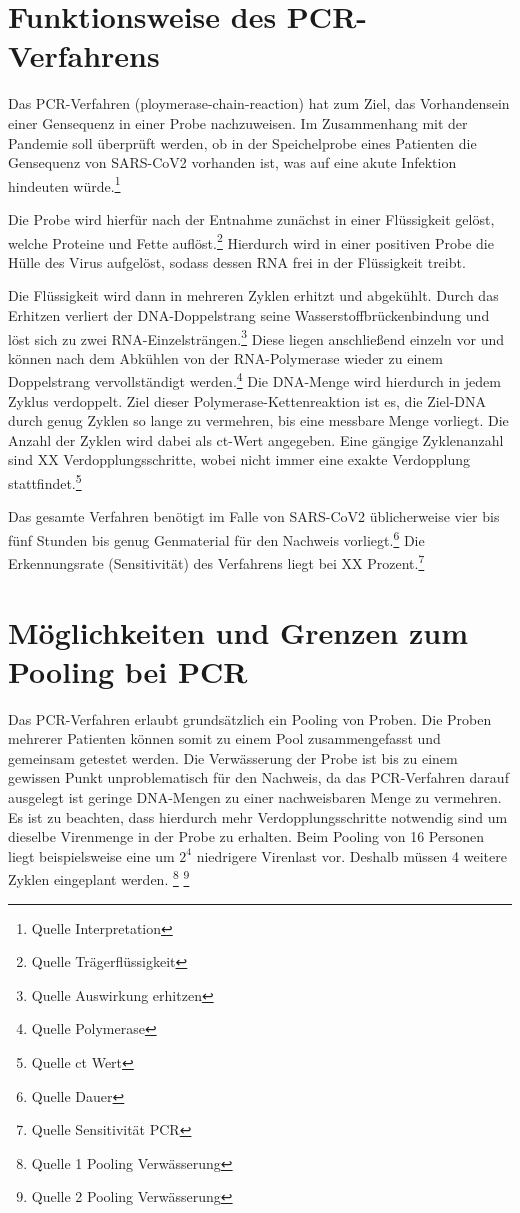 \cleardoublepage

\section{Funktionsweise des PCR-Verfahrens}
Das PCR-Verfahren (ploymerase-chain-reaction) hat zum Ziel, das Vorhandensein einer Gensequenz in einer Probe nachzuweisen.
Im Zusammenhang mit der Pandemie soll überprüft werden, ob in der Speichelprobe eines Patienten die Gensequenz von SARS-CoV2 vorhanden ist, was auf eine akute Infektion hindeuten würde.\footnote{Quelle Interpretation}

Die Probe wird hierfür nach der Entnahme zunächst in einer Flüssigkeit gelöst, welche Proteine und Fette auflöst.\footnote{Quelle Trägerflüssigkeit}
Hierdurch wird in einer positiven Probe die Hülle des Virus aufgelöst, sodass dessen RNA frei in der Flüssigkeit treibt.

Die Flüssigkeit wird dann in mehreren Zyklen erhitzt und abgekühlt.
Durch das Erhitzen verliert der DNA-Doppelstrang seine Wasserstoffbrückenbindung und löst sich zu zwei RNA-Einzelsträngen.\footnote{Quelle Auswirkung erhitzen}
Diese liegen anschließend einzeln vor und können nach dem Abkühlen von der RNA-Polymerase wieder zu einem Doppelstrang vervollständigt werden.\footnote{Quelle Polymerase}
Die DNA-Menge wird hierdurch in jedem Zyklus verdoppelt.
Ziel dieser Polymerase-Kettenreaktion ist es, die Ziel-DNA durch genug Zyklen so lange zu vermehren, bis eine messbare Menge vorliegt.
Die Anzahl der Zyklen wird dabei als ct-Wert angegeben.
Eine gängige Zyklenanzahl sind XX Verdopplungsschritte, wobei nicht immer eine exakte Verdopplung stattfindet.\footnote{Quelle ct Wert}

Das gesamte Verfahren benötigt im Falle von SARS-CoV2 üblicherweise vier bis fünf Stunden bis genug Genmaterial für den Nachweis vorliegt.\footnote{Quelle Dauer}
Die Erkennungsrate (Sensitivität) des Verfahrens liegt bei XX Prozent.\footnote{Quelle Sensitivität PCR}

\cleardoublepage

\section{Möglichkeiten und Grenzen zum Pooling bei PCR}
Das PCR-Verfahren erlaubt grundsätzlich ein Pooling von Proben.
Die Proben mehrerer Patienten können somit zu einem Pool zusammengefasst und gemeinsam getestet werden.
Die Verwässerung der Probe ist bis zu einem gewissen Punkt unproblematisch für den Nachweis, da das PCR-Verfahren darauf ausgelegt ist geringe DNA-Mengen zu einer nachweisbaren Menge zu vermehren.
Es ist zu beachten, dass hierdurch mehr Verdopplungsschritte notwendig sind um dieselbe Virenmenge in der Probe zu erhalten.
Beim Pooling von 16 Personen liegt beispielsweise eine um $2^{4}$ niedrigere Virenlast vor.
Deshalb müssen 4 weitere Zyklen eingeplant werden.
\footnote{Quelle 1 Pooling Verwässerung}
\footnote{Quelle 2 Pooling Verwässerung}

